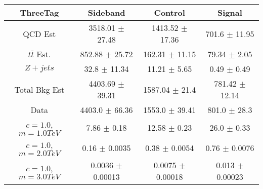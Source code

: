 \begin{footnotesize} 
\begin{tabular}{c|c|c|c} 
ThreeTag & Sideband & Control & Signal \\ 
\hline\hline 
QCD Est & 3518.01 $\pm$ 27.48 & 1413.52 $\pm$ 17.36 & 701.6 $\pm$ 11.95\\ 
$t\bar{t}$ Est.  & 852.88 $\pm$ 25.72 & 162.31 $\pm$ 11.15 & 79.34 $\pm$ 2.05\\ 
$Z+jets$ & 32.8 $\pm$ 11.34 & 11.21 $\pm$ 5.65 & 0.49 $\pm$ 0.49\\ 
Total Bkg Est & 4403.69 $\pm$ 39.31 & 1587.04 $\pm$ 21.4 & 781.42 $\pm$ 12.14\\ 
Data & 4403.0 $\pm$ 66.36 & 1553.0 $\pm$ 39.41 & 801.0 $\pm$ 28.3\\ 
$c=1.0$,$m=1.0TeV$ & 7.86 $\pm$ 0.18 & 12.58 $\pm$ 0.23 & 26.0 $\pm$ 0.33\\ 
$c=1.0$,$m=2.0TeV$ & 0.16 $\pm$ 0.0035 & 0.38 $\pm$ 0.0054 & 0.76 $\pm$ 0.0076\\ 
$c=1.0$,$m=3.0TeV$ & 0.0036 $\pm$ 0.00013 & 0.0075 $\pm$ 0.00018 & 0.013 $\pm$ 0.00023\\ 
\hline\hline 
\end{tabular} 
\end{footnotesize} 
\newline 
